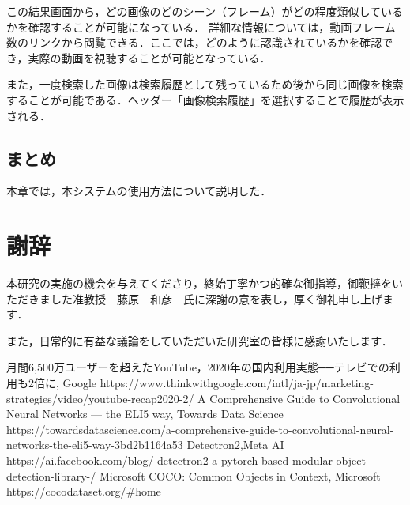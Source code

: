 \documentclass[a4j,12pt,dvipdfmx]{jreport}
\renewcommand{\bibname}{参考文献}
\begin{document}
この結果画面から，どの画像のどのシーン（フレーム）がどの程度類似しているかを確認することが可能になっている．
詳細な情報については，動画フレーム数のリンクから閲覧できる．ここでは，どのように認識されているかを確認でき，実際の動画を視聴することが可能となっている．

また，一度検索した画像は検索履歴として残っているため後から同じ画像を検索することが可能である．ヘッダー「画像検索履歴」を選択することで履歴が表示される．

\section{まとめ}
本章では，本システムの使用方法について説明した．

\clearpage

\chapter*{謝辞}
本研究の実施の機会を与えてくださり，終始丁寧かつ的確な御指導，御鞭撻をいただきました准教授　藤原　和彦　氏に深謝の意を表し，厚く御礼申し上げます．\par
また，日常的に有益な議論をしていただいた研究室の皆様に感謝いたします．

\clearpage

\begin{thebibliography}{9}
\addcontentsline{toc}{chapter}{\bibname}
 月間6,500万ユーザーを超えたYouTube，2020年の国内利用実態──テレビでの利用も2倍に, Google https://www.thinkwithgoogle.com/intl/ja-jp/marketing-strategies/video/youtube-recap2020-2/
 A Comprehensive Guide to Convolutional Neural Networks — the ELI5 way, Towards Data Science https://towardsdatascience.com/a-comprehensive-guide-to-convolutional-neural-networks-the-eli5-way-3bd2b1164a53
 Detectron2,Meta AI https://ai.facebook.com/blog/-detectron2-a-pytorch-based-modular-object-detection-library-/
 Microsoft COCO: Common Objects in Context, Microsoft https://cocodataset.org/#home

\end{thebibliography}
\end{document}
